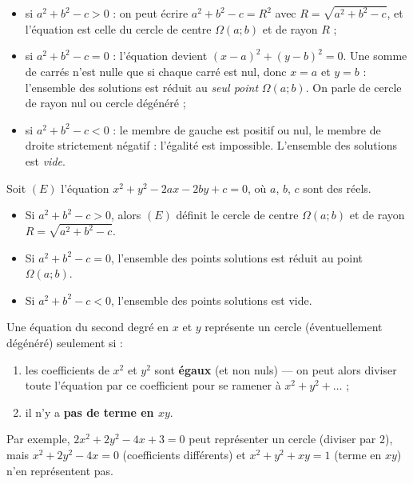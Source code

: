 \documentclass[11pt]{article}
\newcommand{\cle}[1]{{\popxbold\color{popdark}#1}}
\begin{document}
\begin{itemize}
\item si $a^2 + b^2 - c > 0$ : on peut écrire $a^2 + b^2 - c = R^2$ avec $R = \sqrt{a^2+b^2-c}$, et l'équation est celle du cercle de centre $\Omega(a ; b)$ et de rayon $R$ ;
\item si $a^2 + b^2 - c = 0$ : l'équation devient $(x-a)^2 + (y-b)^2 = 0$. Une somme de carrés n'est nulle que si chaque carré est nul, donc $x = a$ et $y = b$ : l'ensemble des solutions est réduit au \emph{seul point} $\Omega(a ; b)$. On parle de \cle{cercle de rayon nul} ou cercle dégénéré ;
\item si $a^2 + b^2 - c < 0$ : le membre de gauche est positif ou nul, le membre de droite strictement négatif : l'égalité est impossible. L'ensemble des solutions est \emph{vide}.
\end{itemize}

\begin{propriete}
Soit $(E)$ l'équation $x^2 + y^2 - 2ax - 2by + c = 0$, où $a$, $b$, $c$ sont des réels.
\begin{itemize}
\item Si $a^2 + b^2 - c > 0$, alors $(E)$ définit le cercle de centre $\Omega(a ; b)$ et de rayon $R = \sqrt{a^2 + b^2 - c}$.
\item Si $a^2 + b^2 - c = 0$, l'ensemble des points solutions est réduit au point $\Omega(a ; b)$.
\item Si $a^2 + b^2 - c < 0$, l'ensemble des points solutions est vide.
\end{itemize}
\end{propriete}

\begin{aretenir}
Une équation du second degré en $x$ et $y$ représente un cercle (éventuellement dégénéré) seulement si :
\begin{enumerate}
\item les coefficients de $x^2$ et $y^2$ sont \textbf{égaux} (et non nuls) — on peut alors diviser toute l'équation par ce coefficient pour se ramener à $x^2 + y^2 + \dots$ ;
\item il n'y a \textbf{pas de terme en $xy$}.
\end{enumerate}
Par exemple, $2x^2 + 2y^2 - 4x + 3 = 0$ peut représenter un cercle (diviser par $2$), mais $x^2 + 2y^2 - 4x = 0$ (coefficients différents) et $x^2 + y^2 + xy = 1$ (terme en $xy$) n'en représentent pas.
\end{aretenir}
\end{document}
